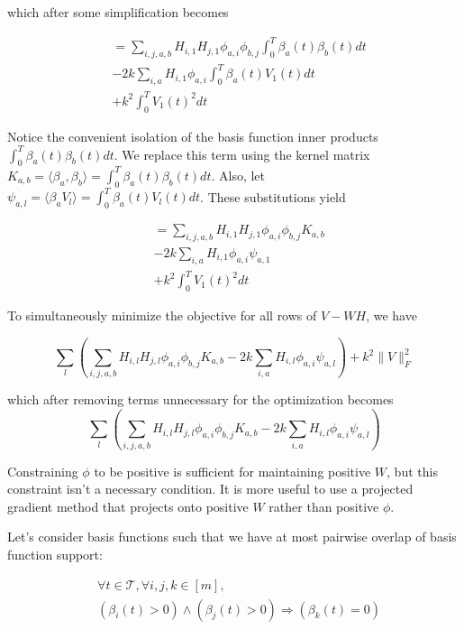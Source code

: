 \documentclass{amsart}
\begin{document}
  which after some simplification becomes

  \begin{align*}
    & = \sum_{i,j,a,b} H_{i,1} H_{j,1} \phi_{a,i} \phi_{b,j} \int_0^T \beta_a(t) \beta_b(t) dt\\
    & - 2 k \sum_{i,a} H_{i,1} \phi_{a,i} \int_0^T \beta_a(t) V_1(t) dt\\
    & + k^2 \int_0^T V_1(t)^2 dt
  \end{align*}

  Notice the convenient isolation of the basis function inner products $\int_0^T \beta_a(t) \beta_b(t) dt$. We replace this term using the kernel matrix $K_{a,b} = \langle \beta_a, \beta_b \rangle = \int_0^T \beta_a(t) \beta_b(t) dt$. Also, let $\psi_{a,l} = \langle \beta_a V_l \rangle = \int_0^T \beta_a(t) V_l(t) dt$. These substitutions yield 

  \begin{align*}
    & = \sum_{i,j,a,b} H_{i,1} H_{j,1} \phi_{a,i} \phi_{b,j} K_{a,b}\\
    & - 2 k \sum_{i,a} H_{i,1} \phi_{a,i} \psi_{a,1}\\
    & + k^2 \int_0^T V_1(t)^2 dt
  \end{align*}


  To simultaneously minimize the objective for all rows of $V - W H$, we have

  \[
  \sum_l \left(\sum_{i,j,a,b} H_{i,l} H_{j,l} \phi_{a,i} \phi_{b,j} K_{a,b} - 2 k \sum_{i,a} H_{i,l} \phi_{a,i} \psi_{a,l} \right) + k^2 \| V \|_F^2
  \]

  which after removing terms unnecessary for the optimization becomes
  \[
  \sum_l \left(\sum_{i,j,a,b} H_{i,l} H_{j,l} \phi_{a,i} \phi_{b,j} K_{a,b} - 2 k \sum_{i,a} H_{i,l} \phi_{a,i} \psi_{a,l} \right)
  \]

  Constraining $\phi$ to be positive is sufficient for maintaining positive $W$, but this constraint isn't a necessary condition. It is more useful to use a projected gradient method that projects onto positive $W$ rather than positive $\phi$.
  
  Let's consider basis functions such that we have at most pairwise overlap of basis function support:


  \begin{align*}
    & \forall t \in \mathcal{T}, \forall i, j, k \in [m], \\
    & (\beta_i(t) > 0) \land (\beta_j(t) > 0) \Rightarrow (\beta_k(t) = 0)
  \end{align*}
\end{document}

